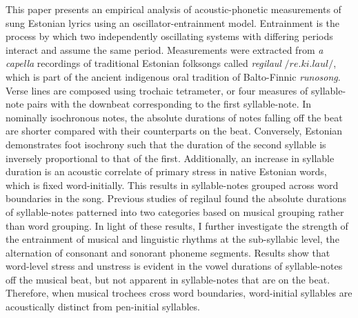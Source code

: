 \documentclass[12pt]{report}	%
\theoremstyle{plain} %
\theoremstyle{definition}
\theoremstyle{remark}
\numberwithin{equation}{section}
\begin{document}
This paper presents an empirical analysis of acoustic-phonetic measurements of sung Estonian lyrics using an oscillator-entrainment model. Entrainment is the process by which two independently oscillating systems with differing periods interact and assume the same period. 
Measurements were extracted from {\it a capella} recordings of traditional Estonian folksongs called {\it regilaul} \(/re.ki.laul/\), which is part of the ancient indigenous oral tradition of Balto-Finnic {\it runosong}. Verse lines are composed using trochaic tetrameter, or four measures of syllable-note pairs with the downbeat corresponding to the first syllable-note. In nominally isochronous notes, the absolute durations of notes falling off the beat are shorter compared with their counterparts on the beat. Conversely, Estonian demonstrates foot isochrony such that the duration of the second syllable is inversely proportional to that of the first. Additionally, an increase in syllable duration is an acoustic correlate of primary stress in native Estonian words, which is fixed word-initially. This results in syllable-notes grouped across word boundaries in the song. Previous studies of regilaul found the absolute durations of syllable-notes patterned into two categories based on musical grouping rather than word grouping. In light of these results, I further investigate the strength of the entrainment of musical and linguistic rhythms at the sub-syllabic level, the alternation of consonant and sonorant phoneme segments. Results show that word-level stress and unstress is evident in the vowel durations of syllable-notes off the musical beat, but not apparent in syllable-notes that are on the beat. Therefore, when musical trochees cross word boundaries, word-initial syllables are acoustically distinct from pen-initial syllables. 

 
 




%


%
%


%
%
\end{document}
